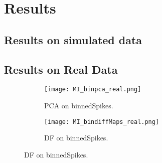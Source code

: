
\section{Results}

\subsection{Results on simulated data}

%
%
%
%
%
%
%
%
%
%
%



\subsection{Results on Real Data}
\begin{frame}[allowframebreaks]
\begin{figure}
\centering
\begin{subfigure}{.5\textwidth}
\texttt{[image: MI\_binpca\_real.png]}
\caption{PCA on binnedSpikes.}
\end{subfigure}%
\begin{subfigure}{0.5\textwidth}
\texttt{[image: MI\_bindiffMaps\_real.png]}
\caption{DF on binnedSpikes.}
\end{subfigure}
\end{figure}
\end{frame}


